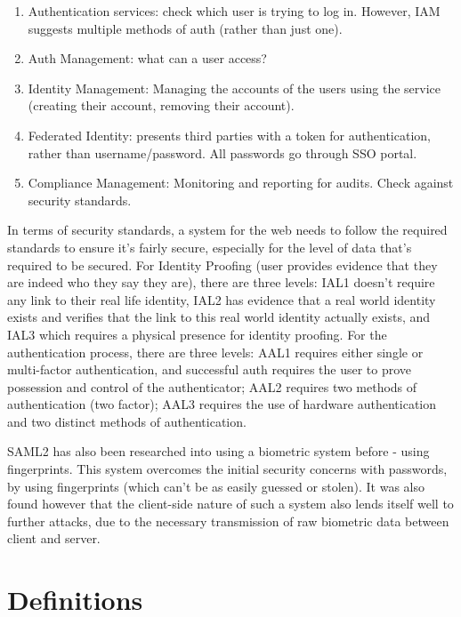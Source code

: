\documentclass[14pt]{article}
\begin{document}
\begin{enumerate}
  \item Authentication services: check which user is trying to log in. However, IAM suggests multiple methods of auth (rather than just one).
  \item Auth Management: what can a user access?
  \item Identity Management: Managing the accounts of the users using the service (creating their account, removing their account).
  \item Federated Identity: presents third parties with a token for authentication, rather than username/password. All passwords go through SSO portal.
  \item Compliance Management: Monitoring and reporting for audits. Check against security standards.
\end{enumerate}
\cite{SSOOverview}

In terms of security standards, a system for the web needs to follow the required standards to ensure it's fairly secure,
especially for the level of data that's required to be secured. For Identity Proofing (user provides evidence that they are indeed who they say they are),
there are three levels: IAL1 doesn't require any link to their real life identity, IAL2 has evidence that a real world identity exists and verifies that the link to this real world identity actually exists,
and IAL3 which requires a physical presence for identity proofing. For the authentication process, there are three levels: AAL1 requires either single or multi-factor authentication, and successful auth requires
the user to prove possession and control of the authenticator; AAL2 requires two methods of authentication (two factor); AAL3 requires the use of hardware authentication and two distinct methods of authentication.
\cite{NISTDigitalIdentityGuidelines}


SAML2 has also been researched into using a biometric system before - using fingerprints. This system
overcomes the initial security concerns with passwords, by using fingerprints (which can't be as easily guessed or
stolen). It was also found however that the client-side nature of such a system also lends itself well to further attacks,
due to the necessary transmission of raw biometric data between client and server. \cite{SAMLFingerPrint}
\section{Definitions}
\end{document}
